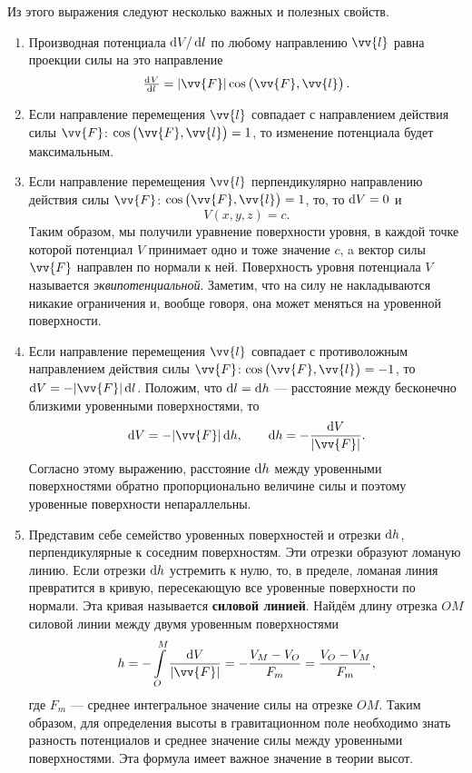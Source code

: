 \documentclass[11pt, a4paper]{article}
\theoremstyle{plain}
\theoremstyle{definition}
\theoremstyle{remark}
\begin{document}
Из этого выражения следуют несколько важных и полезных свойств.
\begin{enumerate}
    \item Производная потенциала $\dif V/ \dif l$ по любому направлению $\vv{l}$ равна проекции силы на
        это направление
        \begin{equation*}
            \od{V}{l} =  |\vv{F}|\cos \left(\vv{F}, \vv{l}\right).
        \end{equation*}
    \item Если направление перемещения $\vv{l}$ совпадает с направлением действия силы $\vv{F}$: $\cos\left( \vv{F}, \vv{l} \right) = 1$, то изменение потенциала будет максимальным.
    \item Если направление перемещения $\vv{l}$ перпендикулярно направлению действия силы $\vv{F}$: $\cos\left( \vv{F}, \vv{l} \right) = 1$, то, то $\dif V = 0$ и 
        \begin{equation*}
            V\left( x, y, z \right) = c.
        \end{equation*}
        Таким образом, мы получили уравнение поверхности уровня, в каждой точке которой потенциал $V$ принимает одно и тоже значение $c$, a вектор силы $\vv{F}$ направлен по нормали к ней. Поверхность уровня потенциала $V$ называется \textit{эквипотенциальной}. Заметим, что на силу не накладываются никакие ограничения и, вообще говоря, она может меняться на уровенной поверхности.
    \item Если направление перемещения $\vv{l}$ совпадает с противоложным направлением действия силы $\vv{F}$: $\cos\left( \vv{F}, \vv{l} \right) = -1$, то $\dif V = - |\vv{F}| \dif l$. Положим, что $\dif l = \dif h$ --- расстояние между бесконечно близкими уровенными поверхностями, то
        \begin{equation*}
            \dif V = - |\vv{F}| \dif h, \qquad \dif h = -\dfrac{\dif V}{|\vv{F}|}.     
        \end{equation*}
        Согласно этому выражению, расстояние $\dif h$ между уровенными поверхностями обратно пропорционально величине силы и поэтому уровенные поверхности непараллельны.

	\item Представим себе семейство уровенных поверхностей и отрезки $\dif h$, перпендикулярные к соседним поверхностям. Эти отрезки образуют ломаную линию. Если отрезки $\dif h$ устремить к нулю, то, в пределе, ломаная линия превратится в кривую, пересекающую все уровенные поверхности по нормали. Эта кривая называется \textbf{силовой линией}. Найдём длину отрезка $OM$ силовой линии между двумя уровенным
        поверхностями
        \begin{equation*}
            h = -\int\limits_{O}^{M} \dfrac{\dif V}{|\vv{F}|} = - \dfrac{V_M - V_O}{F_m} =
            \dfrac{V_O - V_M}{F_m},
        \end{equation*}
        где $F_m$ --- среднее интегральное значение силы на отрезке $OM$. Таким образом, для
        определения высоты в гравитационном поле необходимо знать разность потенциалов и среднее
        значение силы между уровенными поверхностями. Эта формула имеет важное значение в теории
        высот.
\end{enumerate}

\end{document}
